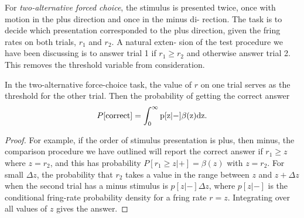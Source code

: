 \begin{ntn}
  \label{ntn:two-alternative forced choice}
  For \emph{two-alternative forced choice}, the stimulus is presented
twice, once with motion in the plus direction and once in the minus di-
rection. The task is to decide which presentation corresponded to the plus
direction, given the fring rates on both trials, $r_1$ and $r_2$. A natural exten-
sion of the test procedure we have been discussing is to answer trial 1 if
$r_1 \geq r_2 $ and otherwise answer trial 2. This removes the threshold variable
from consideration.
\end{ntn}

\begin{prop}
  \label{prop:two-alternative correct probability}
 In the two-alternative force-choice task, the value of $r$ on one trial serves
as the threshold for the other trial. Then the probability of getting the correct answer
\begin{equation}
  \label{eq:3.6}
  P[\rm{correct}]=\int_{0}^{\infty}{p[z|-]\beta(z)dz}.
\end{equation}
 \begin{proof}
 For example, if the order of stimulus presentation is plus, then minus, the comparison procedure we have
outlined will report the correct answer if $r_1 \geq z$ where $z=r_2$,
and this has probability $P[r_1\geq z|+]=\beta(z)$ with $z=r_2$. For
small $\Delta z$, the probability that $r_2$ takes a value in the range
between $z$ and $z+\Delta z$ when the second trial has a minus
stimulus is $p[z|-]\Delta z$, where $p[z|-]$ is the conditional
fring-rate probability density for a fring rate $r=z$. Integrating over all values of $z$
gives the answer.
 \end{proof}
\end{prop}


